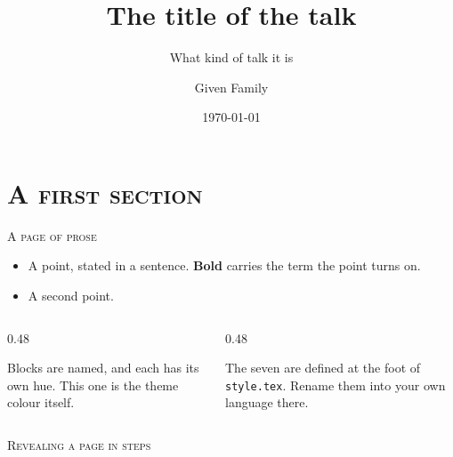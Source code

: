 \documentclass[xcolor=dvipsnames, aspectratio=1610]{beamer}
\title[Short title]{The title of the talk}
\subtitle{What kind of talk it is}
\author[Family]{Given Family}
\institute[Short]{Your institution}
\date{\today}
\begin{document}
\begin{frame}[plain]
  \slatetitlepage
\end{frame}

\section{\textsc{A first section}}

\begin{frame}{\textsc{A page of prose}}

  \begin{itemize}
    \item A point, stated in a sentence. \textbf{Bold} carries the term the
      point turns on.
    \item A second point.
  \end{itemize}

  \vspace{2.5mm}
  \begin{columns}[T]
    \begin{column}{0.48\linewidth}
      \begin{ExampleBox}
        Blocks are named, and each has its own hue. This one is the theme
        colour itself.
      \end{ExampleBox}
    \end{column}
    \begin{column}{0.48\linewidth}
      \begin{CommentBox}
        The seven are defined at the foot of \texttt{style.tex}. Rename them
        into your own language there.
      \end{CommentBox}
    \end{column}
  \end{columns}

\end{frame}

\begin{frame}{\textsc{Revealing a page in steps}}

  \begin{itemize}
  \end{itemize}


\end{frame}
\end{document}
